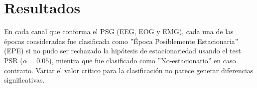 \chapter{Resultados}

%


En cada canal que conforma el PSG (EEG, EOG y EMG), 
cada una de las \'epocas consideradas fue clasificada como 
''\'Epoca Posiblemente Estacionaria'' (EPE) si no pudo ser rechazado la hip\'otesis de 
estacionariedad usando el test PSR ($\alpha = 0.05$), mientra que 
fue clasificado como ''No-estacionario'' en caso contrario. Variar el valor cr\'itico
para la clasificaci\'on no parece generar diferencias significativas.



